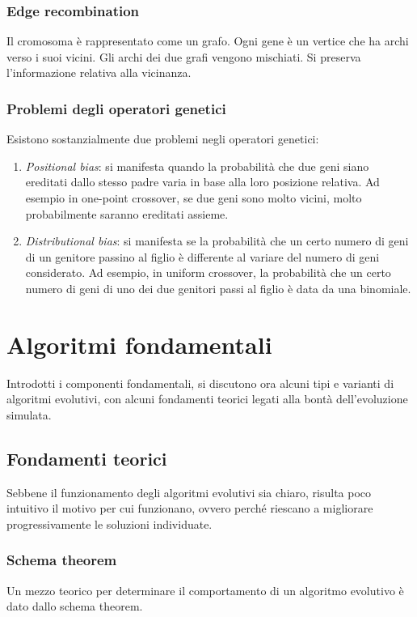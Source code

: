 \documentclass[a4paper]{article}
\begin{document}
\subsubsection{Edge recombination}
Il cromosoma è rappresentato come un grafo.
Ogni gene è un vertice che ha archi verso i suoi vicini. Gli archi dei due
grafi vengono mischiati. Si preserva l’informazione relativa alla vicinanza.

\subsubsection{Problemi degli operatori genetici}
Esistono sostanzialmente due problemi negli operatori genetici:
\begin{enumerate}
    \item \emph{Positional bias}: si manifesta quando la probabilità che due geni
    siano ereditati dallo stesso padre varia in base alla loro posizione relativa. Ad esempio
    in one-point crossover, se due geni sono molto vicini, molto probabilmente saranno ereditati
    assieme.
    \item \emph{Distributional bias}: si manifesta se la probabilità che un certo numero di geni 
    di un genitore passino al figlio è differente al variare del numero di geni considerato.
    Ad esempio, in uniform crossover, la probabilità che un certo numero di geni di uno dei due genitori
    passi al figlio è data da una binomiale. 
\end{enumerate}

\newpage
\section{Algoritmi fondamentali}
Introdotti i componenti fondamentali, si discutono ora alcuni tipi e varianti di algoritmi
evolutivi, con alcuni fondamenti teorici legati alla bontà dell'evoluzione simulata.

\subsection{Fondamenti teorici}
Sebbene il funzionamento degli algoritmi evolutivi sia chiaro, 
risulta poco intuitivo il motivo per cui funzionano, ovvero perché riescano a 
migliorare progressivamente le soluzioni individuate.

\subsubsection{Schema theorem}
Un mezzo teorico per determinare il comportamento di un algoritmo evolutivo è dato 
dallo schema theorem.
\end{document}
